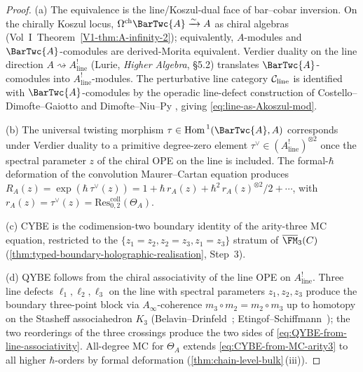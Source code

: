 \begin{proof}
\textup{(a)} The equivalence is the line/Koszul-dual face of bar--cobar
inversion. On the chirally Koszul locus,
$\Omega^{\mathrm{ch}}\BarTwc{A} \xrightarrow{\sim} A$ as chiral
algebras (Vol~I~Theorem~\ref*{V1-thm:A-infinity-2}); equivalently,
$A$-modules and $\BarTwc{A}$-comodules are derived-Morita equivalent.
Verdier duality on the line direction
$A \rightsquigarrow A^{!}_{\mathrm{line}}$
\textup(Lurie, \emph{Higher Algebra}, \S 5.2\textup) translates
$\BarTwc{A}$-comodules into $A^{!}_{\mathrm{line}}$-modules.
The perturbative line category $\mathcal C_{\mathrm{line}}$ is identified
with $\BarTwc{A}$-comodules by the operadic line-defect construction
of Costello--Dimofte--Gaiotto \cite{CDG20} and Dimofte--Niu--Py
\cite{DNP25}, giving \eqref{eq:line-as-Akoszul-mod}.

\textup{(b)} The universal twisting morphism
$\tau \in \mathrm{Hom}^{\,1}(\BarTwc{A}, A)$ corresponds under Verdier
duality to a primitive degree-zero element
$\tau^{\vee} \in (A^{!}_{\mathrm{line}})^{\otimes 2}$ once the spectral
parameter $z$ of the chiral OPE on the line is included. The
formal-$\hbar$ deformation of the convolution Maurer--Cartan
equation produces
$R_{A}(z) = \exp(\hbar\,\tau^{\vee}(z)) = 1 + \hbar\,r_{A}(z) +
\hbar^{2}\,r_{A}(z)^{\otimes 2}/2 + \cdots$,
with $r_{A}(z) = \tau^{\vee}(z) = \mathrm{Res}^{\mathrm{coll}}_{0,2}(\Theta_{A})$.

\textup{(c)} CYBE is the codimension-two boundary identity of the
arity-three MC equation, restricted to the
$\{z_{1} = z_{2}, z_{2} = z_{3}, z_{1} = z_{3}\}$ stratum of
$\overline{\FM}_{3}(C)$
(\cref{thm:typed-boundary-holographic-realisation}, Step~3).

\textup{(d)} QYBE follows from the chiral associativity of the line
OPE on $A^{!}_{\mathrm{line}}$.  Three line defects $\ell_{1},
\ell_{2}, \ell_{3}$ on the line with spectral parameters
$z_{1}, z_{2}, z_{3}$ produce the boundary three-point block via
$A_{\infty}$-coherence $m_{3}\circ m_{2} = m_{2}\circ m_{3}$ up to
homotopy on the Stasheff associahedron $K_{3}$
(Belavin--Drinfeld~\cite{BD83}; Etingof--Schiffmann~\cite{ES98}); the
two reorderings of the three crossings produce the two sides of
\eqref{eq:QYBE-from-line-associativity}.  All-degree MC for
$\Theta_{A}$ extends \eqref{eq:CYBE-from-MC-arity3} to all higher
$\hbar$-orders by formal deformation
(\cref{thm:chain-level-bulk}\,(iii)).
\end{proof}

